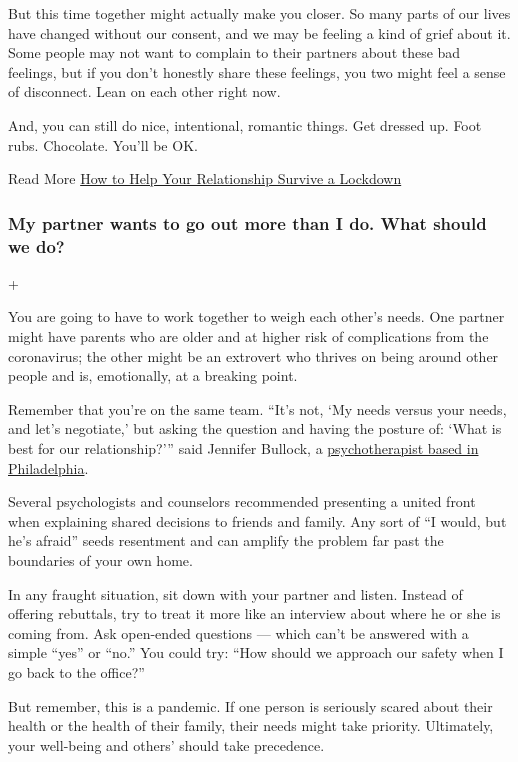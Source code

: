 But this time together might actually make you closer. So many parts of
our lives have changed without our consent, and we may be feeling a kind
of grief about it. Some people may not want to complain to their
partners about these bad feelings, but if you don't honestly share these
feelings, you two might feel a sense of disconnect. Lean on each other
right now.

And, you can still do nice, intentional, romantic things. Get dressed
up. Foot rubs. Chocolate. You'll be OK.

 Read More
\href{https://www.nytimes.com/2020/04/03/smarter-living/coronavirus-relationship-advice.html}{How
to Help Your Relationship Survive a Lockdown}

\hypertarget{my-partner-wants-to-go-out-more-than-i-do-what-should-we-do}{%
\subsubsection{My partner wants to go out more than I do. What should we
do?}\label{my-partner-wants-to-go-out-more-than-i-do-what-should-we-do}}

+

You are going to have to work together to weigh each other's needs. One
partner might have parents who are older and at higher risk of
complications from the coronavirus; the other might be an extrovert who
thrives on being around other people and is, emotionally, at a breaking
point.

Remember that you're on the same team. ``It's not, `My needs versus your
needs, and let's negotiate,' but asking the question and having the
posture of: `What is best for our relationship?''' said Jennifer
Bullock, a \href{https://www.letsdevelopphilly.com/}{psychotherapist
based in Philadelphia}.

Several psychologists and counselors recommended presenting a united
front when explaining shared decisions to friends and family. Any sort
of ``I would, but he's afraid'' seeds resentment and can amplify the
problem far past the boundaries of your own home.

In any fraught situation, sit down with your partner and listen. Instead
of offering rebuttals, try to treat it more like an interview about
where he or she is coming from. Ask open-ended questions --- which can't
be answered with a simple ``yes'' or ``no.'' You could try: ``How should
we approach our safety when I go back to the office?''

But remember, this is a pandemic. If one person is seriously scared
about their health or the health of their family, their needs might take
priority. Ultimately, your well-being and others' should take
precedence.

